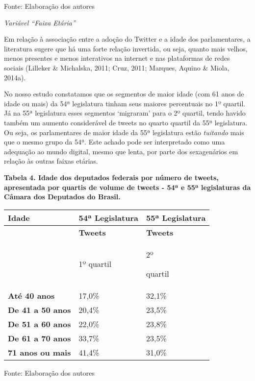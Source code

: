 Fonte: Elaboração dos autores

\emph{Variável ``Faixa Etária''}

Em relação à associação entre a adoção do Twitter e a idade dos
parlamentares, a literatura sugere que há uma forte relação invertida,
ou seja, quanto mais velhos, menos presentes e menos interativos na
internet e nas plataformas de redes sociais (Lilleker \& Michalska,
2011; Cruz, 2011; Marques, Aquino \& Miola, 2014a).

No nosso estudo constatamos que os segmentos de maior idade (com 61 anos
de idade ou mais) da 54ª legislatura tinham seus maiores percentuais no
1º quartil. Já na 55ª legislatura esses segmentos `migraram' para o 2º
quartil, tendo havido também um aumento considerável de tweets no quarto
quartil da 55ª legislatura. Ou seja, os parlamentares de maior idade da
55ª legislatura estão \emph{tuitando} mais que o mesmo grupo da 54ª.
Este achado pode ser interpretado como uma adequação ao mundo digital,
mesmo que lenta, por parte dos sexagenários em relação às outras faixas
etárias.

\textbf{Tabela 4. Idade dos deputados federais por número de tweets,
apresentada por quartis de volume de tweets - 54ª e 55ª legislaturas da
Câmara dos Deputados do Brasil.}

\begin{longtable}[]{@{}lll@{}}
\toprule
\textbf{Idade} & \textbf{54ª Legislatura} & \textbf{55ª
Legislatura}\tabularnewline
\midrule
\endhead
& \textbf{Tweets} & \textbf{Tweets}\tabularnewline
\begin{minipage}[t]{0.32\columnwidth}\raggedright\strut
\strut
\end{minipage} & \begin{minipage}[t]{0.32\columnwidth}\raggedright\strut
1º quartil\strut
\end{minipage} & \begin{minipage}[t]{0.32\columnwidth}\raggedright\strut
2º

quartil\strut
\end{minipage}\tabularnewline
\textbf{Até 40 anos} & 17,0\% & 32,1\%\tabularnewline
\textbf{De 41 a 50 anos} & 20,4\% & 23,5\%\tabularnewline
\textbf{De 51 a 60 anos} & 22,0\% & 23,8\%\tabularnewline
\textbf{De 61 a 70 anos} & 33,7\% & 23,5\%\tabularnewline
\textbf{71 anos ou mais} & 41,4\% & 31,0\%\tabularnewline
\bottomrule
\end{longtable}

Fonte: Elaboração dos autores


